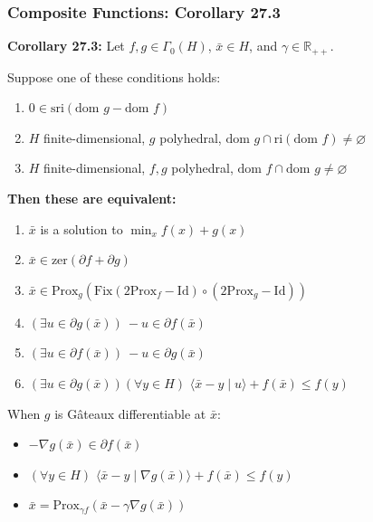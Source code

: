 \documentclass[aspectratio=169,10pt]{beamer}
\begin{document}
\begin{frame}[allowframebreaks]
\frametitle{Composite Functions: Corollary 27.3}

\textbf{Corollary 27.3:} Let $f, g \in \Gamma_0(H)$, $\bar{x} \in H$, and $\gamma \in \mathbb{R}_{++}$.

Suppose one of these conditions holds:
\begin{enumerate}
    \item[(a)] $0 \in \text{sri}(\text{dom } g - \text{dom } f)$
    \item[(b)] $H$ finite-dimensional, $g$ polyhedral, $\text{dom } g \cap \text{ri}(\text{dom } f) \neq \varnothing$
    \item[(c)] $H$ finite-dimensional, $f, g$ polyhedral, $\text{dom } f \cap \text{dom } g \neq \varnothing$
\end{enumerate}

\textbf{Then these are equivalent:}
\begin{enumerate}
    \item[(i)] $\bar{x}$ is a solution to $\min_x f(x) + g(x)$
    \item[(ii)] $\bar{x} \in \text{zer}(\partial f + \partial g)$
    \item[(iii)] $\bar{x} \in \text{Prox}_g(\text{Fix}(2\text{Prox}_f - \text{Id}) \circ (2\text{Prox}_g - \text{Id}))$
    \item[(iv)] $(\exists u \in \partial g(\bar{x}))\ -u \in \partial f(\bar{x})$
    \item[(v)] $(\exists u \in \partial f(\bar{x}))\ -u \in \partial g(\bar{x})$
    \item[(vi)] $(\exists u \in \partial g(\bar{x}))(\forall y \in H)$ $\langle \bar{x} - y \mid u \rangle + f(\bar{x}) \leq f(y)$
\end{enumerate}

When $g$ is Gâteaux differentiable at $\bar{x}$:
\begin{itemize}
    \item $-\nabla g(\bar{x}) \in \partial f(\bar{x})$
    \item $(\forall y \in H)$ $\langle \bar{x} - y \mid \nabla g(\bar{x}) \rangle + f(\bar{x}) \leq f(y)$
    \item $\bar{x} = \text{Prox}_{\gamma f}(\bar{x} - \gamma \nabla g(\bar{x}))$
\end{itemize}

\end{frame}
\end{document}
